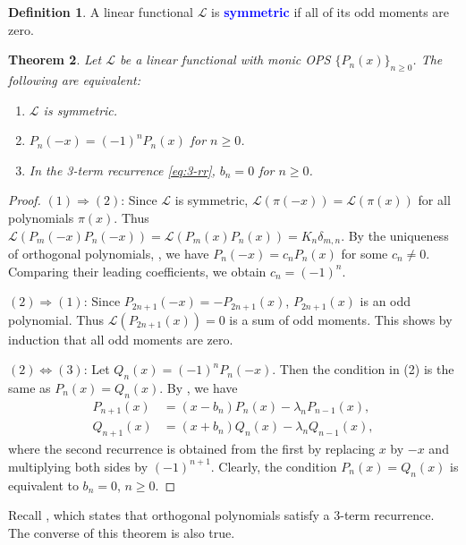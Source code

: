 \documentclass[oneside]{book}
\numberwithin{equation}{section}
\newtheorem{thm}{Theorem}[section]
\theoremstyle{definition}
\newtheorem{defn}[thm]{Definition}
\newcommand\LL{\mathcal{L}}
\renewcommand\emph[1]{\textcolor{blue}{\bf #1}}
\begin{document}
\begin{defn}
  A linear functional \( \LL \) is \emph{symmetric} if all of its odd
  moments are zero.
\end{defn}

\begin{thm}\label{thm:17}
  Let \( \LL \) be a linear functional with monic OPS
  \( \{ P_n(x) \}_{n\ge 0} \). The following are equivalent:
  \begin{enumerate}
  \item \( \LL \) is symmetric.
  \item \( P_n(-x) = (-1)^n P_n(x) \) for \( n\ge0 \).
  \item In the 3-term recurrence \eqref{eq:3-rr}, \( b_n=0 \) for \( n\ge0 \).
  \end{enumerate}
\end{thm}

\begin{proof}
  \( (1) \Rightarrow (2) \): Since \( \LL \) is symmetric,
  \( \LL(\pi(-x)) = \LL(\pi(x)) \) for all polynomials \( \pi(x) \).
  Thus
  \( \LL(P_m(-x)P_n(-x)) = \LL(P_m(x)P_n(x)) = K_n \delta_{m,n} \).
By the uniqueness of orthogonal polynomials, ,
we have \( P_n(-x) = c_n P_n(x) \) for some \( c_n\ne 0 \).
Comparing their leading coefficients, we obtain \( c_n = (-1)^n \).

\( (2) \Rightarrow (1) \): Since \( P_{2n+1}(-x) = -P_{2n+1}(x) \),
\( P_{2n+1}(x) \) is an odd polynomial. Thus \( \LL(P_{2n+1}(x))=0 \)
is a sum of odd moments. This shows by induction that all odd moments
are zero.

\( (2) \Leftrightarrow (3) \): Let \( Q_n(x) = (-1)^n P_n(-x) \). Then
the condition in (2) is the same as \( P_n(x) = Q_n(x) \). By
, we have
\begin{align*}
    P_{n+1}(x) &= (x-b_n) P_n(x) - \lambda_n P_{n-1}(x),\\
    Q_{n+1}(x) &= (x+b_n) Q_n(x) - \lambda_n Q_{n-1}(x),
\end{align*}
where the second recurrence is obtained from the first by replacing
\( x \) by \( -x \) and multiplying both sides by \( (-1)^{n+1} \).
Clearly, the condition \( P_n(x) = Q_n(x) \)
is equivalent to \( b_n = 0 \), \( n\ge0 \).
\end{proof}


Recall , which states that orthogonal polynomials
satisfy a 3-term recurrence. The converse of this theorem is also
true.
\end{document}
